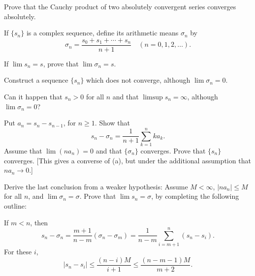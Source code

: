 \begin{myexercise}
    \label{ex:3.13}
    Prove that the Cauchy product of two absolutely convergent series converges absolutely.
\end{myexercise}


\begin{myexercise}
    \label{ex:3.14}
    If $\{s_n\}$ is a complex sequence, define its arithmetic means $\sigma_n$ by 
    \begin{equation*}
        \sigma_n = \frac{s_0+s_1+\cdots+s_n}{n+1}
        \quad 
        (n=0,1,2,\dots).
    \end{equation*}
    \begin{asparaenum}[(a)]
        \item If $\lim s_n = s$, prove that $\lim \sigma_n = s$.
        \item Construct a sequence $\{s_n\}$ which does not converge, although $\lim \sigma_n= 0$.
        \item Can it happen that $s_n> 0$ for all $n$ and that $\limsup s_n = \infty$, although $\lim \sigma_n= 0$?
        \item Put $a_n = s_n - s_{n-1}$, for $n \geq 1$. 
        Show that
        \begin{equation*}
            s_n-\sigma_n = \frac{1}{n+1}\sum_{k=1}^{n}k a_k .
        \end{equation*}
        Assume that $\lim (n a_n)= 0$ and that $\{\sigma_n\}$ converges. 
        Prove that $\{s_n\}$ converges.
        [This gives a converse of (a), but under the additional assumption that $n a_n \rightarrow 0$.]
        \item Derive the last conclusion from a weaker hypothesis: 
        Assume $M < \infty$, $| n a_n | \leq M$ for all $n$, 
        and $\lim \sigma_n= \sigma$. 
        Prove that $\lim s_n = \sigma$, by completing the following outline:
        
        If $m < n$, then
        \begin{equation*}
            s_n - \sigma_n 
            = \frac{m+1}{n-m}(\sigma_n - \sigma_m)
            = \frac{  1}{n-m}\sum_{i=m+1}^{n}(s_n - s_i) .
        \end{equation*}
        For these $i$,
        \begin{equation*}
            \left| s_n - s_i \right| 
            \leq \frac{(n-i)M}{i+1} 
            \leq \frac{(n-m-1)M} {m+2} .
        \end{equation*}


\end{asparaenum}
\end{myexercise}
